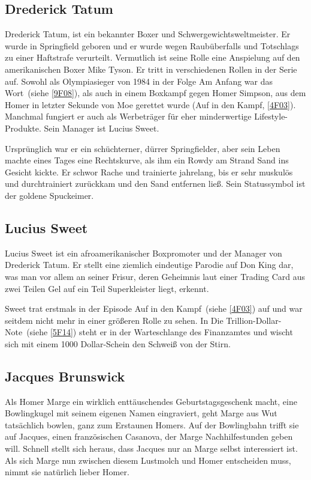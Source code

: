 {\subsection{Drederick Tatum}\label{Tatum}
Drederick Tatum, ist ein bekannter Boxer und Schwergewichtsweltmeister. Er wurde in Springfield geboren und er wurde wegen Raubüberfalls und Totschlags zu einer Haftstrafe verurteilt. Vermutlich ist seine Rolle eine Anspielung auf den amerikanischen Boxer Mike Tyson. Er tritt in verschiedenen Rollen in der Serie auf. Sowohl als Olympiasieger von 1984 in der Folge \glqq Am Anfang war das Wort\grqq\ (siehe \ref{9F08}), als auch in einem Boxkampf gegen Homer Simpson, aus dem Homer in letzter Sekunde von Moe gerettet wurde (\glqq Auf in den Kampf\grqq , \ref{4F03}). Manchmal fungiert er auch als Werbeträger für eher minderwertige Lifestyle-Produkte. Sein Manager ist Lucius Sweet.

Ursprünglich war er ein schüchterner, dürrer Springfielder, aber sein Leben machte eines Tages eine Rechtskurve, als ihm ein Rowdy am Strand Sand ins Gesicht kickte. Er schwor Rache und trainierte jahrelang, bis er sehr muskulös und durchtrainiert zurückkam und den Sand entfernen ließ. Sein Statussymbol ist der goldene Spuckeimer.

\subsection{Lucius Sweet}
Lucius Sweet ist ein afroamerikanischer Boxpromoter und der Manager von Drederick Tatum. Er stellt eine ziemlich eindeutige Parodie auf Don King dar, was man vor allem an seiner Frisur, deren Geheimnis laut einer Trading Card aus zwei Teilen Gel auf ein Teil Superkleister liegt, erkennt.

Sweet trat erstmals in der Episode \glqq Auf in den Kampf\grqq\ (siehe \ref{4F03}) auf und war seitdem nicht mehr in einer größeren Rolle zu sehen. In \glqq Die Trillion-Dollar-Note\grqq\ (siehe \ref{5F14}) steht er in der Warteschlange des Finanzamtes und wischt sich mit einem 1000 Dollar-Schein den Schweiß von der Stirn.


\subsection{Jacques Brunswick}
Als Homer Marge ein wirklich enttäuschendes Geburtstagsgeschenk macht, eine Bowlingkugel mit seinem eigenen Namen eingraviert, geht Marge aus Wut tatsächlich bowlen, ganz zum Erstaunen Homers. Auf der Bowlingbahn trifft sie auf Jacques, einen französischen Casanova, der Marge Nachhilfestunden geben will. Schnell stellt sich heraus, dass Jacques nur an Marge selbst interessiert ist. Als sich Marge nun zwischen diesem Lustmolch und Homer entscheiden muss, nimmt sie natürlich lieber Homer.

}
